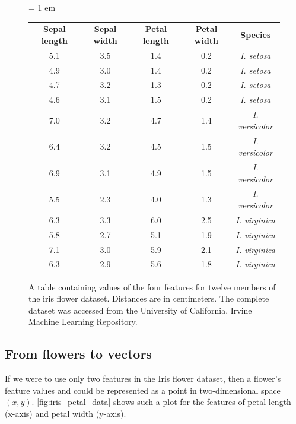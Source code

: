 \begin{figure}[h]
\centering
\tabcolsep = 1 em
\mySfFamily
\begin{tabular}{c c c c c}
\textbf{Sepal length} & \textbf{Sepal width} & \textbf{Petal length} & \textbf{Petal width} & \textbf{Species} \\
5.1 & 3.5 & 1.4 & 0.2 & \textit{I. setosa} \\
4.9 & 3.0 & 1.4 & 0.2 & \textit{I. setosa} \\
4.7 & 3.2 & 1.3 & 0.2 & \textit{I. setosa} \\
4.6 & 3.1 & 1.5 & 0.2 & \textit{I. setosa} \\
7.0 & 3.2 & 4.7 & 1.4 & \textit{I. versicolor} \\
6.4 & 3.2 & 4.5 & 1.5 & \textit{I. versicolor} \\
6.9 & 3.1 & 4.9 & 1.5 & \textit{I. versicolor} \\
5.5 & 2.3 & 4.0 & 1.3 & \textit{I. versicolor} \\
6.3 & 3.3 & 6.0 & 2.5 & \textit{I. virginica} \\
5.8 & 2.7 & 5.1 & 1.9 & \textit{I. virginica} \\
7.1 & 3.0 & 5.9 & 2.1 & \textit{I. virginica} \\
6.3 & 2.9 & 5.6 & 1.8 & \textit{I. virginica} \\
\end{tabular}
\caption{A table containing values of the four features for twelve members of the iris flower dataset. Distances are in centimeters. The complete dataset was accessed from the University of California, Irvine Machine Learning Repository.}
\label{fig:iris_feature_table}
\end{figure}

\begin{qbox}\end{qbox}

\FloatBarrier
{}
\subsection{From flowers to vectors}

If we were to use only two features in the Iris flower dataset, then a flower's feature values  and  could be represented as a point in two-dimensional space $(x, y)$. \autoref{fig:iris_petal_data} shows such a plot for the features of petal length (x-axis) and petal width (y-axis).

